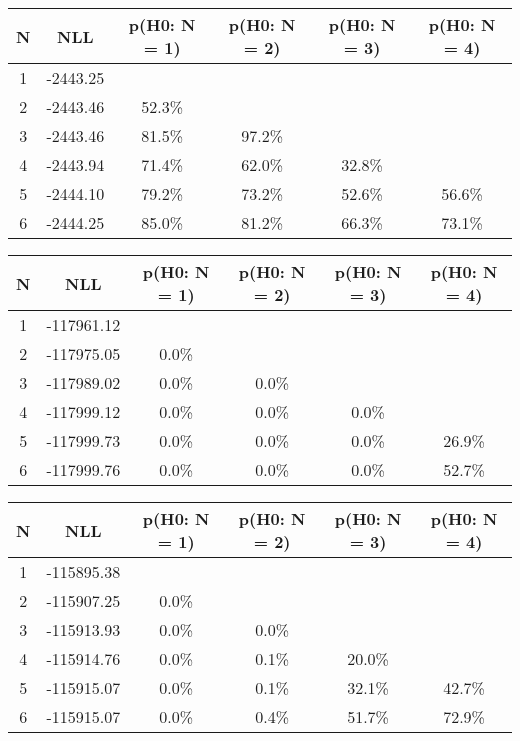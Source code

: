 \begin{table}[htb]
	\begin{center}
{\footnotesize\renewcommand{\arraystretch}{1.4}
		\begin{tabular}{cc||cccc}
			N & NLL & p(H0: N = 1) & p(H0: N = 2) & p(H0: N = 3) & p(H0: N = 4)\\ 
		\hline
1 & -2443.25 & & & & \\
2 & -2443.46 & 52.3\% & & & \\
3 & -2443.46 & 81.5\% & 97.2\% & & \\
4 & -2443.94 & 71.4\% & 62.0\% & 32.8\% & \\
5 & -2444.10 & 79.2\% & 73.2\% & 52.6\% & 56.6\% \\
6 & -2444.25 & 85.0\% & 81.2\% & 66.3\% & 73.1\% \\
	\end{tabular}
		\label{tab:lab}
	}
	\end{center}\end{table}

\begin{table}[htb]
	\begin{center}
{\footnotesize\renewcommand{\arraystretch}{1.4}
		\begin{tabular}{cc||cccc}
			N & NLL & p(H0: N = 1) & p(H0: N = 2) & p(H0: N = 3) & p(H0: N = 4)\\ 
		\hline
1 & -117961.12 & & & & \\
2 & -117975.05 & 0.0\% & & & \\
3 & -117989.02 & 0.0\% & 0.0\% & & \\
4 & -117999.12 & 0.0\% & 0.0\% & 0.0\% & \\
5 & -117999.73 & 0.0\% & 0.0\% & 0.0\% & 26.9\% \\
6 & -117999.76 & 0.0\% & 0.0\% & 0.0\% & 52.7\% \\
	\end{tabular}
		\label{tab:lab}
	}
	\end{center}\end{table}

\begin{table}[htb]
	\begin{center}
{\footnotesize\renewcommand{\arraystretch}{1.4}
		\begin{tabular}{cc||cccc}
			N & NLL & p(H0: N = 1) & p(H0: N = 2) & p(H0: N = 3) & p(H0: N = 4)\\ 
		\hline
1 & -115895.38 & & & & \\
2 & -115907.25 & 0.0\% & & & \\
3 & -115913.93 & 0.0\% & 0.0\% & & \\
4 & -115914.76 & 0.0\% & 0.1\% & 20.0\% & \\
5 & -115915.07 & 0.0\% & 0.1\% & 32.1\% & 42.7\% \\
6 & -115915.07 & 0.0\% & 0.4\% & 51.7\% & 72.9\% \\
	\end{tabular}
		\label{tab:lab}
	}
	\end{center}\end{table}


